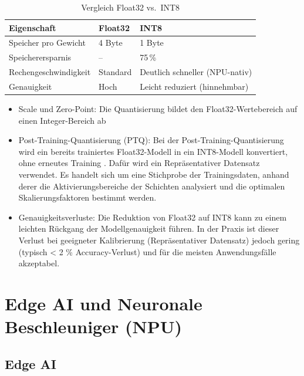 \begin{table}[H]
    \centering
    \label{tab:float32-vs-int8}
    \begin{tabular}{|p{}|l|l|}
        \hline
        \textbf{Eigenschaft} & \textbf{Float32} & \textbf{INT8} \\
        \hline
        Speicher pro Gewicht & 4 Byte & 1 Byte \\
        \hline
        Speicherersparnis & -- & 75\,\% \\
        \hline
        Rechengeschwindigkeit & Standard & Deutlich schneller (NPU-nativ) \\
        \hline
        Genauigkeit & Hoch & Leicht reduziert (hinnehmbar) \\
        \hline
    \end{tabular}
    \caption{Vergleich Float32 vs.\ INT8}
\end{table}

\begin{itemize}
    \item Scale und Zero-Point: Die Quantisierung bildet den Float32-Wertebereich auf einen Integer-Bereich ab
    \item Post-Training-Quantisierung (PTQ): Bei der Post-Training-Quantisierung wird ein bereits trainiertes Float32-Modell in ein INT8-Modell konvertiert, ohne erneutes Training \cite[Kap. 8]{pointerPyTorchFuerDeep2020}. Dafür wird ein Repräsentativer Datensatz verwendet. Es handelt sich um eine Stichprobe der Trainingsdaten, anhand derer die Aktivierungsbereiche der Schichten analysiert und die optimalen Skalierungsfaktoren bestimmt werden.
    \item Genauigkeitsverluste: Die Reduktion von Float32 auf INT8 kann zu einem leichten Rückgang der Modellgenauigkeit führen. In der Praxis ist dieser Verlust bei geeigneter Kalibrierung (Repräsentativer Datensatz) jedoch gering (typisch < 2 \% Accuracy-Verlust) und für die meisten Anwendungsfälle akzeptabel.
\end{itemize}

\section{Edge AI und Neuronale Beschleuniger (NPU)}\label{sec:edge-ai}

\subsection{Edge AI}\label{sub:edge-ai-detail}

